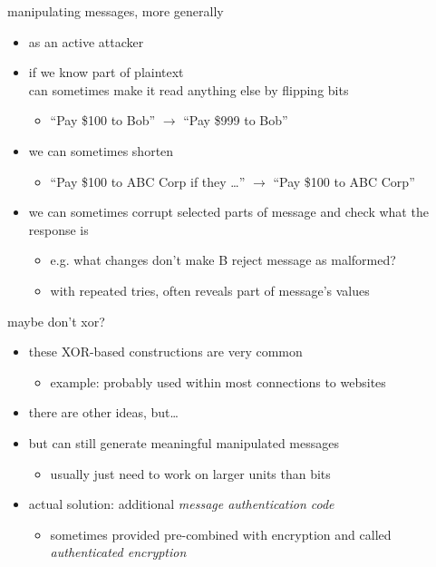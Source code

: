 \begin{frame}{manipulating messages, more generally}
\begin{itemize}
\item as an active attacker
\vspace{.5cm}
\item if we know part of plaintext \\
    can sometimes make it read anything else by flipping bits
    \begin{itemize}
    \item ``Pay \$100 to Bob'' $\rightarrow$ ``Pay \$999 to Bob''
    \end{itemize}
\item we can sometimes shorten
    \begin{itemize}
    \item ``Pay \$100 to ABC Corp if they \ldots'' $\rightarrow$ ``Pay \$100 to ABC Corp''
    \end{itemize}
\item we can sometimes corrupt selected parts of message and check what the response is
    \begin{itemize}
    \item e.g. what changes don't make B reject message as malformed?
    \item with repeated tries, often reveals part of message's values
    \end{itemize}
\end{itemize}
\end{frame}

\begin{frame}{maybe don't xor?}
    \begin{itemize}
    \item these XOR-based constructions are very common
        \begin{itemize}
        \item example: probably used within most connections to websites
        \end{itemize}
    \item there are other ideas, but\ldots
    \item but can still generate meaningful manipulated messages
        \begin{itemize}
        \item usually just need to work on larger units than bits
        \end{itemize}
    \vspace{.5cm}
    \item actual solution: additional \textit{message authentication code}
        \begin{itemize}
        \item sometimes provided pre-combined with encryption and called \textit{authenticated encryption}
        \end{itemize}
    \end{itemize}
\end{frame}
